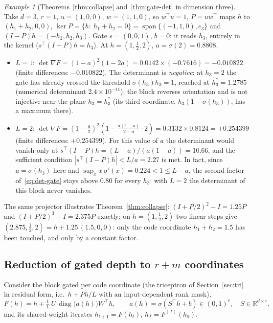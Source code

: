 \documentclass[11pt,a4paper]{article}
\theoremstyle{plain}
\theoremstyle{definition}
\theoremstyle{remark}
\newtheorem{example}{Example}
\newcommand{\R}{\mathbb R}
\newcommand{\diag}{\operatorname{diag}}
\newcommand{\spn}{\operatorname{span}}
\newcommand{\T}{\top}
\begin{document}
\begin{example}[Theorems~\ref{thm:collapse} and~\ref{thm:gate-det} in dimension three]
\label{ex:det}
Take $d=3$, $r=1$, $u=(1,0,0)$, $w=(1,1,0)$, so $w^\T u=1$, $P=uw^\T$ maps $h$
to $(h_1+h_2,0,0)$, $\ker P=\{h:\ h_1+h_2=0\}=\spn\{(-1,1,0),e_3\}$ and
$(I-P)h=(-h_2,h_2,h_3)$. Gate $s=(0,0,1)$, $b=0$: it reads $h_3$, entirely in
the kernel ($s^\T(I-P)h=h_3$). At $h=(1,\tfrac12,2)$, $a=\sigma(2)=0.8808$.
\begin{itemize}
  \item $L=1$: $\det\nabla F=(1-a)^2(1-2a)=0.0142\times(-0.7616)=-0.010822$
  (finite differences: $-0.010822$). The determinant is \emph{negative}: at
  $h_3=2$ the gate has already crossed the threshold $\sigma(h_3)h_3=1$,
  reached at $h_3^\ast=1.2785$ (numerical determinant $2.4\times10^{-11}$);
  the block reverses orientation and is not injective near the plane
  $h_3=h_3^\ast$ (its third coordinate, $h_3(1-\sigma(h_3))$, has a maximum
  there).
  \item $L=2$: $\det\nabla F=(1-\tfrac a2)^2(1-\tfrac{a(1-a)}{2-a}\cdot2)=0.3132\times0.8124=+0.254399$
  (finite differences: $+0.254399$). For this value of $a$ the determinant
  would vanish only at $s^\T(I-P)h=(L-a)/(a(1-a))=10.66$, and the sufficient
  condition $|s^\T(I-P)h|<L/a=2.27$ is met. In fact, since $a=\sigma(h_3)$
  here and $\sup_xx\,\sigma'(x)=0.224<1\le L-a$, the second factor
  of~\eqref{eq:det-gate} stays above $0.80$ for every $h_3$: with $L=2$ the
  determinant of this block never vanishes.
\end{itemize}
The same projector illustrates Theorem~\ref{thm:collapse}:
$(I+P/2)^2-I=1.25P$ and $(I+P/2)^3-I=2.375P$ exactly; on $h=(1,\tfrac12,2)$
two linear steps give $(2.875,\tfrac12,2)=h+1.25\,(1.5,0,0)$: only the code
coordinate $h_1+h_2=1.5$ has been touched, and only by a constant factor.
\end{example}

\subsection{Reduction of gated depth to \texorpdfstring{$r+m$}{r+m} coordinates}
\label{sec:thmA}
Consider the block gated per code coordinate (the triceptron of
Section~\ref{sec:tri} in residual form, i.e.\ $h+Ph/L$ with an
input-dependent rank mask),
\begin{equation}
  F(h)=h+\tfrac1L\,U\,\diag\bigl(a(h)\bigr)W^\T h,\qquad
  a(h)=\sigma(S^\T h+b)\in(0,1)^r,\quad S\in\R^{d\times r},
  \label{eq:blocA}
\end{equation}
and its shared-weight iterates $h_{t+1}=F(h_t)$, $h_T=F^{(T)}(h_0)$.
\end{document}
